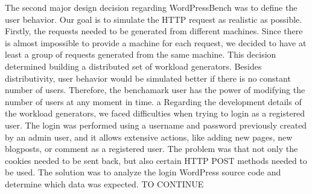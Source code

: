 The second major design decision regarding WordPressBench was to define the user behavior. Our goal is to simulate the HTTP request as realistic as possible. Firstly, the requests needed to be generated from different machines. Since there is almost impossible to provide a machine for each request, we decided to have at least a group of requests generated from the same machine. This decision determined building a distributed set of workload generators. Besides distributivity, user behavior would be simulated better if there is no constant number of users. Therefore, the benchamark user has the power of modifying the number of users at any moment in time.
a
Regarding the development details of the workload generators, we faced difficulties when trying to login as a registered user. The login was performed using a username and password previously created by an admin user, and it allows extensive actions, like adding new pages, new blogposts, or comment as a registered user. The problem was that not only the cookies needed to be sent back, but also certain HTTP POST methods needed to be used. The solution was to analyze the login WordPress source code and determine which data was expected. TO CONTINUE
